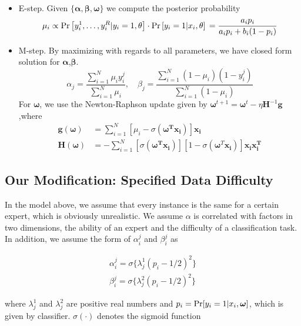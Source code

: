 \documentclass{article}
\begin{document}
\begin{itemize}
    \item \textup{E-step}. Given $\{\bm{\alpha,\beta,\omega}\}$ we compute the posterior probability
    $$\mu_i 
\propto \operatorname { Pr } \left[ y _ { i } ^ { 1 } , \ldots , y _ { i } ^ { R } | y _ { i } = 1 , \theta \right] \cdot \operatorname { Pr } \left[ y _ { i } = 1 | x _ { i } , \theta \right]
\\ = \frac{a_i p_i}{a_i p_i+b_i(1-p_i)}$$
    
    \item \textup{M-step}. By maximizing with regards to all parameters, we have closed form solution for $\bm{\alpha}$,$\bm{\beta}$.
    $$\alpha_j=\frac{\sum^N_{i=1}\mu_i y_i^j}{\sum^N_{i=1}\mu_i}, \quad \beta_j=\frac{\sum^N_{i=1}(1-\mu_i)(1-y_i^j)}{\sum^N_{i=1}(1-\mu_i)}$$
    For $\bm{\omega}$, we use the Newton-Raphson update given by $\bm{\omega}^{t+1}=\bm{\omega}^t-\eta\bm{H}^{-1}\bm{g}$,where
    \begin{align*}
        \bm{g(\omega)}&=\sum^N_{i=1}[\mu_i-\sigma(\bm{\omega^T\bm{x_i}})]\bm{x_i}\\
        \bm{H(\omega)}&=-\sum^N_{i=1}[\sigma(\bm{\omega^T x_i})][1-\sigma(\bm{\omega}^T\bm{x_i})]\bm{x_ix_i^T}
    \end{align*}
    
\end{itemize}
    

\subsection{Our Modification: Specified Data Difficulty}
In the model above, we assume that every instance is the same for a certain expert, which is obviously unrealistic. We assume $\alpha$ is correlated with factors in two dimensions, the ability of an expert and the difficulty of a classification task. In addition, we assume the form of $\alpha_{i}^{j}$ and 
$\beta_{i}^{j}$ as

\begin{align}
\alpha_{i}^{j}=\sigma\lbrace\lambda_{j}^{1}(p_{i}-1/2)^{2}\rbrace\\
\beta_{i}^{j}=\sigma\lbrace\lambda_{j}^{2}(p_{i}-1/2)^{2}\rbrace
\end{align}

where $\lambda_j^1$ and $\lambda_j^2$ are positive real numbers and $p_i=\textup{Pr}[y_i=1|x_i, \bm{\omega}]$, which is given by classifier. $\sigma(\cdot)$ denotes the sigmoid function
\end{document}
